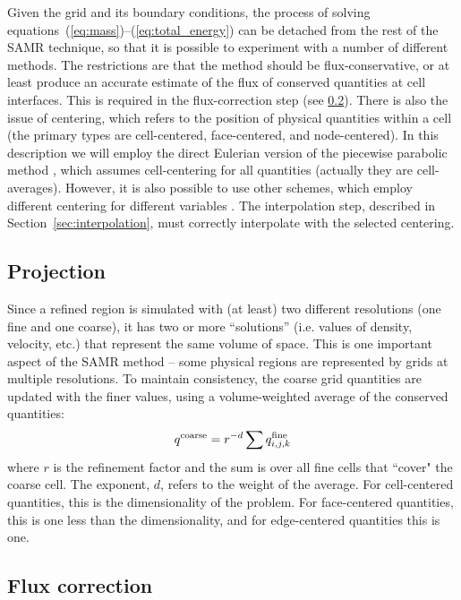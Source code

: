 Given the grid and its boundary conditions, the process of solving
equations~(\ref{eq:mass})--(\ref{eq:total_energy}) can be detached
from the rest of the SAMR technique, so that it is possible to
experiment with a number of different methods.  The restrictions are
that the method should be flux-conservative, or at least produce an
accurate estimate of the flux of conserved quantities at cell
interfaces.  This is required in the flux-correction step (see
\ref{sec:flux_correction}).  There is also the issue of centering,
which refers to the position of physical quantities within a cell (the
primary types are cell-centered, face-centered, and node-centered). In this description we 
will employ the direct Eulerian version of the piecewise
parabolic method \citep{1984JCoPh..54..174C,1995CoPhC..89..149B}, which
assumes cell-centering for all quantities (actually they are
cell-averages).  However, it is also possible to use other schemes,
which employ different centering for different variables
\citep[e.g.,][]{Stone92a}.  The interpolation step, described in
Section~\ref{sec:interpolation}, must correctly interpolate with the
selected centering.

\subsection{Projection}
\label{sec:projection}

Since a refined region is simulated with (at least) two different resolutions (one fine and one coarse), it has two or
more ``solutions'' (i.e. values of density, velocity, etc.) that represent the same volume of space.  This is one important aspect of the SAMR method -- some physical regions are represented by grids at multiple resolutions.  To
maintain consistency, the coarse grid quantities are updated with the finer values, using a volume-weighted average of the conserved quantities:
\begin{equation}
q^{\rm coarse} = r^{-d} \sum q^{\rm fine}_{i, j,k}
\end{equation}
where $r$ is the refinement factor and the sum is over all fine cells that ``cover" the coarse cell. The exponent, $d$, refers to the weight of the average.  For cell-centered quantities, this is the dimensionality of the problem.  For face-centered quantities, this is one less than the dimensionality, and for edge-centered quantities this is one.


\subsection{Flux correction}
\label{sec:flux_correction}

